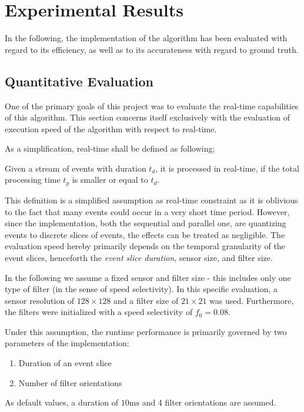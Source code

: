 \newpage
\section{Experimental Results}
In the following, the implementation of the algorithm has been evaluated with regard to its efficiency, as well as to its accurateness with regard to ground truth.

\subsection{Quantitative Evaluation}
One of the primary goals of this project was to evaluate the real-time capabilities of this algorithm.
This section concerns itself exclusively with the evaluation of execution speed of the algorithm with respect to real-time.

As a simplification, real-time shall be defined as following;
\begin{defwrp}
	Given a stream of events with duration $t_d$, it is processed in real-time, if the total processing time $t_p$ is smaller or equal to $t_d$.
\end{defwrp}

This definition is a simplified assumption as real-time constraint as it is oblivious to the fact that many events could occur in a very short time period.
However, since the implementation, both the sequential and parallel one, are quantizing events to discrete slices of events, the effects can be treated as negligible.
The evaluation speed hereby primarily depends on the temporal granularity of the event slices, henceforth the \textit{event slice duration}, sensor size, and filter size.

In the following we assume a fixed sensor and filter size - this includes only one type of filter (in the sense of speed selectivity).
In this specific evaluation, a sensor resolution of $128\times128$ and a filter size of $21\times21$ was used.
Furthermore, the filters were initialized with a speed selectivity of $f_0=0.08$.

Under this assumption, the runtime performance is primarily governed by two parameters of the implementation:
\begin{enumerate}
	\item Duration of an event slice
	\item Number of filter orientations
\end{enumerate}

As default values, a duration of $10\mathrm{ms}$ and 4 filter orientations are assumed.


